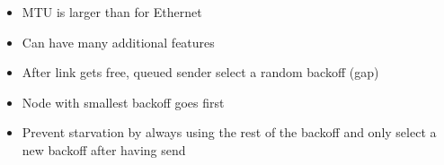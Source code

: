 \begin{itemize}
\begin{itemize}
\begin{itemize}
\begin{itemize}
                            \item MTU is larger than for Ethernet
                            \item Can have many additional features
                        \end{itemize}
                        \begin{itemize}
                            \item After link gets free, queued sender select a random backoff (gap)
                            \item Node with smallest backoff goes first
                            \item Prevent starvation by always using the rest of the backoff and only select a new backoff after having send
                        \end{itemize}
                \end{itemize}
        \end{itemize}
\end{itemize}
